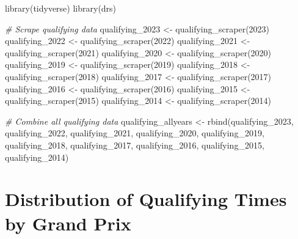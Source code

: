 \documentclass[
]{book}
\newenvironment{Shaded}{\begin{snugshade}}{\end{snugshade}}
\newcommand{\CommentTok}[1]{\textcolor[rgb]{0.56,0.35,0.01}{\textit{#1}}}
\newcommand{\DecValTok}[1]{\textcolor[rgb]{0.00,0.00,0.81}{#1}}
\newcommand{\FunctionTok}[1]{\textcolor[rgb]{0.00,0.00,0.00}{#1}}
\newcommand{\NormalTok}[1]{#1}
\newcommand{\OtherTok}[1]{\textcolor[rgb]{0.56,0.35,0.01}{#1}}
\begin{document}
\begin{Shaded}
\begin{Highlighting}[]
\FunctionTok{library}\NormalTok{(tidyverse)}
\FunctionTok{library}\NormalTok{(drs)}


\CommentTok{\# Scrape qualifying data}
\NormalTok{qualifying\_2023 }\OtherTok{\textless{}{-}} \FunctionTok{qualifying\_scraper}\NormalTok{(}\DecValTok{2023}\NormalTok{)}
\NormalTok{qualifying\_2022 }\OtherTok{\textless{}{-}} \FunctionTok{qualifying\_scraper}\NormalTok{(}\DecValTok{2022}\NormalTok{)}
\NormalTok{qualifying\_2021 }\OtherTok{\textless{}{-}} \FunctionTok{qualifying\_scraper}\NormalTok{(}\DecValTok{2021}\NormalTok{)}
\NormalTok{qualifying\_2020 }\OtherTok{\textless{}{-}} \FunctionTok{qualifying\_scraper}\NormalTok{(}\DecValTok{2020}\NormalTok{)}
\NormalTok{qualifying\_2019 }\OtherTok{\textless{}{-}} \FunctionTok{qualifying\_scraper}\NormalTok{(}\DecValTok{2019}\NormalTok{)}
\NormalTok{qualifying\_2018 }\OtherTok{\textless{}{-}} \FunctionTok{qualifying\_scraper}\NormalTok{(}\DecValTok{2018}\NormalTok{)}
\NormalTok{qualifying\_2017 }\OtherTok{\textless{}{-}} \FunctionTok{qualifying\_scraper}\NormalTok{(}\DecValTok{2017}\NormalTok{)}
\NormalTok{qualifying\_2016 }\OtherTok{\textless{}{-}} \FunctionTok{qualifying\_scraper}\NormalTok{(}\DecValTok{2016}\NormalTok{)}
\NormalTok{qualifying\_2015 }\OtherTok{\textless{}{-}} \FunctionTok{qualifying\_scraper}\NormalTok{(}\DecValTok{2015}\NormalTok{)}
\NormalTok{qualifying\_2014 }\OtherTok{\textless{}{-}} \FunctionTok{qualifying\_scraper}\NormalTok{(}\DecValTok{2014}\NormalTok{)}

\CommentTok{\# Combine all qualifying data}
\NormalTok{qualifying\_allyears }\OtherTok{\textless{}{-}} \FunctionTok{rbind}\NormalTok{(qualifying\_2023,}
\NormalTok{                             qualifying\_2022,}
\NormalTok{                             qualifying\_2021, }
\NormalTok{                             qualifying\_2020,}
\NormalTok{                             qualifying\_2019,}
\NormalTok{                             qualifying\_2018,}
\NormalTok{                             qualifying\_2017,}
\NormalTok{                             qualifying\_2016,}
\NormalTok{                             qualifying\_2015,}
\NormalTok{                             qualifying\_2014)}
\end{Highlighting}
\end{Shaded}

\hypertarget{distribution-of-qualifying-times-by-grand-prix}{%
\section{Distribution of Qualifying Times by Grand Prix}\label{distribution-of-qualifying-times-by-grand-prix}}
\end{document}
